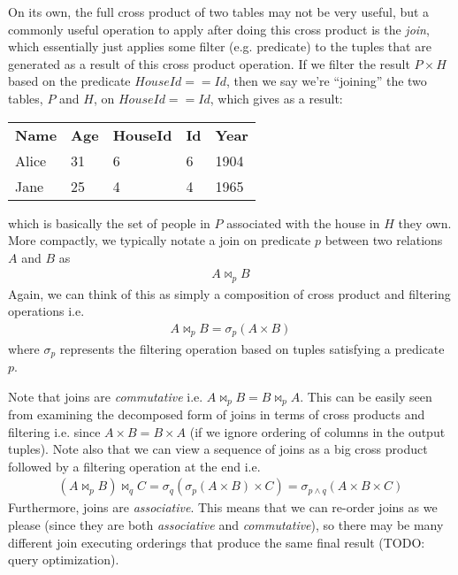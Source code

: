 \documentclass[10pt,a4paper]{article}
\begin{document}
On its own, the full cross product of two tables may not be very useful, but a commonly useful operation to apply after doing this cross product is the \textit{join}, which essentially just applies some filter (e.g. predicate) to the tuples that are generated as a result of this cross product operation. If we filter the result $P \times H$ based on the predicate $HouseId == Id$, then we say we're ``joining'' the two tables, $P$ and $H$, on $HouseId == Id$, which gives as a result:
\begin{center}
    \begin{tabular}{| l | l | l | l | l |}
        \textbf{Name} & \textbf{Age}& \textbf{HouseId} & \textbf{Id} & \textbf{Year} \\
        Alice & 31 & 6 & 6 & 1904\\  
        Jane & 25 & 4 & 4 & 1965   
\end{tabular}
\end{center}
which is basically the set of people in $P$ associated with the house in $H$ they own. More compactly, we typically notate a join on predicate $p$ between two relations $A$ and $B$ as
\begin{align*}
    A \Join_p B
\end{align*}
Again, we can think of this as simply a composition of cross product and filtering operations i.e.
\begin{align*}
    A \Join_p B = \sigma_p(A \times B)
\end{align*}
where $\sigma_p$ represents the filtering operation based on tuples satisfying a predicate $p$.

Note that joins are \textit{commutative} i.e. $A \Join_p B = B \Join_p A$. This can be easily seen from examining the decomposed form of joins in terms of cross products and filtering i.e. since $A \times B = B \times A$ (if we ignore ordering of columns in the output tuples). Note also that we can view a sequence of joins as a big cross product followed by a filtering operation at the end i.e.
\begin{align*}
    (A \Join_p B) \Join_q C = \sigma_q(\sigma_p(A \times B) \times C) = \sigma_{p \wedge q}(A \times B \times C)
\end{align*}
Furthermore, joins are \textit{associative}. This means that we can re-order joins as we please (since they are both \textit{associative} and \textit{commutative}), so there may be many different join executing orderings that produce the same final result (TODO: query optimization).
\end{document}
